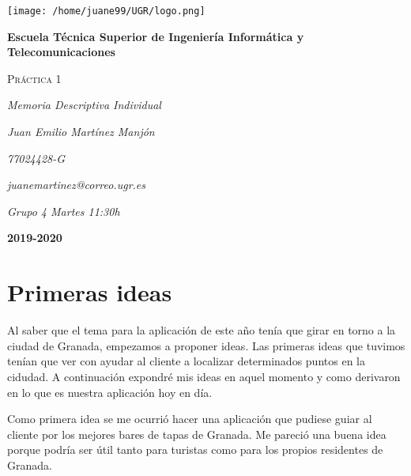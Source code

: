 \documentclass[a4paper,11pt]{article}
\begin{document}

\begin{titlepage}
\centering
{\texttt{[image: /home/juane99/UGR/logo.png]}\par}
\vspace{1cm}
{\bfseries\LARGE Escuela T\'ecnica Superior de Ingenier\'ia Inform\'atica y Telecomunicaciones \par}
\vspace{1cm}
{\scshape\Large Pr\'actica 1 \par}
\vspace{1 cm}
{\itshape\Large Memoria Descriptiva Individual \par}
\vspace{1 cm}
{\slshape\Large Juan Emilio Mart\'inez Manj\'on \par}
{\slshape\Large 77024428-G \par}
{\slshape\Large juanemartinez@correo.ugr.es \par}
{\slshape\Large Grupo 4 Martes 11:30h \par}
\vspace{1 cm}
{\bfseries\Large 2019-2020 \par}

\end{titlepage}

\renewcommand{\contentsname}{\bfseries\LARGE\'Indice\vspace{1 cm}}
\tableofcontents

\newpage


\section{Primeras ideas}

\vspace{5 mm}

Al saber que el tema para la aplicación de este año tenía que girar en torno a la ciudad de Granada, empezamos a proponer ideas. Las primeras ideas que tuvimos tenían que ver con ayudar al cliente a localizar determinados puntos en la cidudad. A continuación expondré mis ideas en aquel momento y como derivaron en lo que es nuestra aplicación hoy en día.

\vspace{5 mm}

Como primera idea se me ocurrió hacer una aplicación que pudiese guiar al cliente por los mejores bares de tapas de Granada. Me pareció una buena idea porque podría ser útil tanto para turistas como para los propios residentes de Granada.
\end{document}
